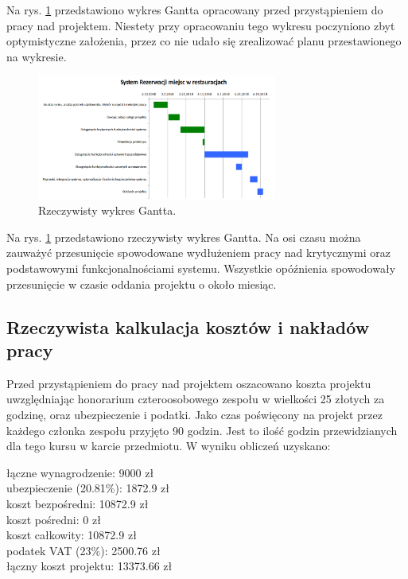\documentclass{article}
\newcommand\tab[1][1cm]{\hspace*{#1}}
\begin{document}
Na rys. \ref{fig:gantt} przedstawiono wykres Gantta opracowany przed przystąpieniem do pracy nad projektem. Niestety przy opracowaniu tego wykresu poczyniono zbyt optymistyczne założenia, przez co nie udało się zrealizować planu przestawionego na wykresie.

\begin{figure}[h]
\centering
	\includegraphics[width=0.70\textwidth]{gantt_real.png}
	\caption{Rzeczywisty wykres Gantta.}
	\label{fig:gantt}
\end{figure}

Na rys. \ref{fig:gantt} przedstawiono rzeczywisty wykres Gantta. Na osi czasu można zauważyć przesunięcie spowodowane wydłużeniem pracy nad krytycznymi oraz podstawowymi funkcjonalnościami systemu. Wszystkie opóźnienia spowodowały przesunięcie w czasie oddania projektu o około miesiąc.


\subsection{Rzeczywista kalkulacja kosztów i nakładów pracy}

Przed przystąpieniem do pracy nad projektem oszacowano koszta projektu uwzględniając honorarium czteroosobowego zespołu w wielkości 25 złotych za godzinę, oraz ubezpieczenie i podatki. Jako czas poświęcony na projekt przez każdego członka zespołu przyjęto 90 godzin. Jest to ilość godzin przewidzianych dla tego kursu w karcie przedmiotu. W wyniku obliczeń uzyskano:

\hspace*{0.35cm} łączne wynagrodzenie: 9000 zł \\
\tab ubezpieczenie (20.81\%): 1872.9 zł \\
\tab koszt bezpośredni: 10872.9 zł \\
\tab koszt pośredni: 0 zł \\
\tab koszt całkowity: 10872.9 zł \\
\tab podatek VAT (23\%): 2500.76 zł \\
\tab łączny koszt projektu: 13373.66 zł
\end{document}
